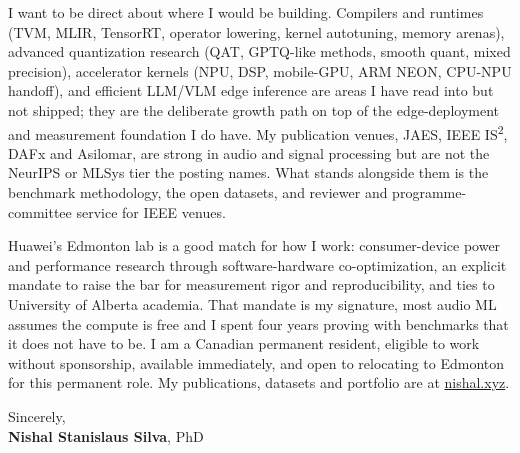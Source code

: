 \documentclass[11pt]{article}
\newcommand{\clName}{Nishal Stanislaus Silva}
\newcommand{\clSite}{https://nishal.xyz}
\begin{document}
I want to be direct about where I would be building. Compilers and runtimes (TVM, MLIR, TensorRT, operator lowering, kernel autotuning, memory arenas), advanced quantization research (QAT, GPTQ-like methods, smooth quant, mixed precision), accelerator kernels (NPU, DSP, mobile-GPU, ARM NEON, CPU-NPU handoff), and efficient LLM/VLM edge inference are areas I have read into but not shipped; they are the deliberate growth path on top of the edge-deployment and measurement foundation I do have. My publication venues, JAES, IEEE IS\textsuperscript{2}, DAFx and Asilomar, are strong in audio and signal processing but are not the NeurIPS or MLSys tier the posting names. What stands alongside them is the benchmark methodology, the open datasets, and reviewer and programme-committee service for IEEE venues.

Huawei's Edmonton lab is a good match for how I work: consumer-device power and performance research through software-hardware co-optimization, an explicit mandate to raise the bar for measurement rigor and reproducibility, and ties to University of Alberta academia. That mandate is my signature, most audio ML assumes the compute is free and I spent four years proving with benchmarks that it does not have to be. I am a Canadian permanent resident, eligible to work without sponsorship, available immediately, and open to relocating to Edmonton for this permanent role. My publications, datasets and portfolio are at \href{\clSite}{nishal.xyz}.

\vspace{10pt}
Sincerely,\\[2pt]
\textbf{\clName}, PhD
\end{document}
